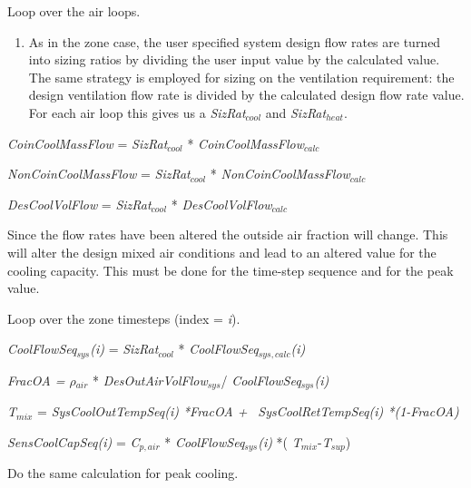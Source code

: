Loop over the air loops.

\begin{enumerate}
\def\labelenumi{(\roman{enumi})}
\tightlist
\setlength\itemindent{25pt} \item As in the zone case, the user specified system design flow rates are turned into sizing ratios by dividing the user input value by the calculated value. The same strategy is employed for sizing on the ventilation requirement: the design ventilation flow rate is divided by the calculated design flow rate value. For each air loop this gives us a \emph{SizRat\(_{cool}\)} and \emph{SizRat\(_{heat}\)}.
\end{enumerate}

\emph{CoinCoolMassFlow} = \emph{SizRat\(_{cool}\)} * \emph{CoinCoolMassFlow\(_{calc}\)}

\emph{NonCoinCoolMassFlow} = \emph{SizRat\(_{cool}\)} * \emph{NonCoinCoolMassFlow\(_{calc}\)}

\emph{DesCoolVolFlow} = \emph{SizRat\(_{cool}\)} * \emph{DesCoolVolFlow\(_{calc}\)}

Since the flow rates have been altered the outside air fraction will change. This will alter the design mixed air conditions and lead to an altered value for the cooling capacity. This must be done for the time-step sequence and for the peak value.

\begin{enumerate}
\def\labelenumi{(\roman{enumi})}
\setcounter{enumi}{1}
\tightlist
{\setlength\itemindent{25pt} \item Loop over the zone timesteps (index = \emph{i}).}
\end{enumerate}

\emph{CoolFlowSeq\(_{sys}\)(i)} = \emph{SizRat\(_{cool}\)} * \emph{CoolFlowSeq\(_{sys,calc}\)(i)}

\emph{FracOA = $\rho$\(_{air}\)} * \emph{DesOutAirVolFlow\(_{sys}\)}/ \emph{CoolFlowSeq\(_{sys}\)(i)}

\emph{T\(_{mix}\)} = \emph{SysCoolOutTempSeq(i) *FracOA +~} \emph{SysCoolRetTempSeq(i) *(1-FracOA)}

\emph{SensCoolCapSeq(i)} = \emph{C\(_{p,air}\)} * \emph{CoolFlowSeq\(_{sys}\)(i)} *( \emph{T\(_{mix}\)}-\emph{T\(_{sup}\)})

\begin{enumerate}
\def\labelenumi{(\roman{enumi})}
\setcounter{enumi}{2}
\tightlist
{\setlength\itemindent{25pt} \item Do the same calculation for peak cooling.}
\end{enumerate}

